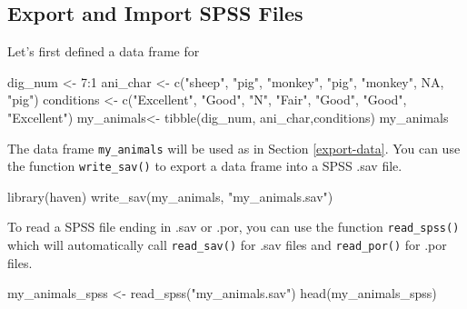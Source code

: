 \documentclass[
]{book}
\newenvironment{Shaded}{\begin{snugshade}}{\end{snugshade}}
\newcommand{\ConstantTok}[1]{\textcolor[rgb]{0.00,0.00,0.00}{#1}}
\newcommand{\DecValTok}[1]{\textcolor[rgb]{0.00,0.00,0.81}{#1}}
\newcommand{\FunctionTok}[1]{\textcolor[rgb]{0.00,0.00,0.00}{#1}}
\newcommand{\NormalTok}[1]{#1}
\newcommand{\OtherTok}[1]{\textcolor[rgb]{0.56,0.35,0.01}{#1}}
\newcommand{\SpecialCharTok}[1]{\textcolor[rgb]{0.00,0.00,0.00}{#1}}
\newcommand{\StringTok}[1]{\textcolor[rgb]{0.31,0.60,0.02}{#1}}
\begin{document}
\hypertarget{export-and-import-spss-files}{%
\subsection{Export and Import SPSS Files}\label{export-and-import-spss-files}}

Let's first defined a data frame for

\begin{Shaded}
\begin{Highlighting}[]
\NormalTok{dig\_num }\OtherTok{\textless{}{-}} \DecValTok{7}\SpecialCharTok{:}\DecValTok{1}
\NormalTok{ani\_char }\OtherTok{\textless{}{-}} \FunctionTok{c}\NormalTok{(}\StringTok{"sheep"}\NormalTok{, }\StringTok{"pig"}\NormalTok{, }\StringTok{"monkey"}\NormalTok{, }\StringTok{"pig"}\NormalTok{, }\StringTok{"monkey"}\NormalTok{, }\ConstantTok{NA}\NormalTok{, }\StringTok{"pig"}\NormalTok{)}
\NormalTok{conditions }\OtherTok{\textless{}{-}} \FunctionTok{c}\NormalTok{(}\StringTok{"Excellent"}\NormalTok{, }\StringTok{"Good"}\NormalTok{, }\StringTok{"N"}\NormalTok{, }\StringTok{"Fair"}\NormalTok{, }\StringTok{"Good"}\NormalTok{, }\StringTok{"Good"}\NormalTok{, }\StringTok{"Excellent"}\NormalTok{)}
\NormalTok{my\_animals}\OtherTok{\textless{}{-}} \FunctionTok{tibble}\NormalTok{(dig\_num, ani\_char,conditions)}
\NormalTok{my\_animals}
\end{Highlighting}
\end{Shaded}

The data frame \texttt{my\_animals} will be used as in Section \ref{export-data}. You can use the function \texttt{write\_sav()} to export a data frame into a SPSS .sav file.

\begin{Shaded}
\begin{Highlighting}[]
\FunctionTok{library}\NormalTok{(haven)}
\FunctionTok{write\_sav}\NormalTok{(my\_animals, }\StringTok{"my\_animals.sav"}\NormalTok{)}
\end{Highlighting}
\end{Shaded}

To read a SPSS file ending in .sav or .por, you can use the function \texttt{read\_spss()} which will automatically call \texttt{read\_sav()} for .sav files and \texttt{read\_por()} for .por files.

\begin{Shaded}
\begin{Highlighting}[]
\NormalTok{my\_animals\_spss }\OtherTok{\textless{}{-}} \FunctionTok{read\_spss}\NormalTok{(}\StringTok{"my\_animals.sav"}\NormalTok{)}
\FunctionTok{head}\NormalTok{(my\_animals\_spss)}
\end{Highlighting}
\end{Shaded}
\end{document}
